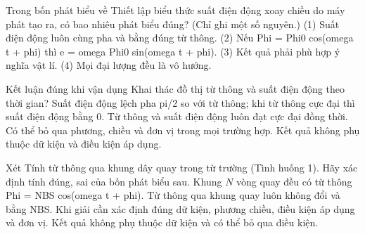 \begin{ex}
Trong bốn phát biểu về Thiết lập biểu thức suất điện động xoay chiều do máy phát tạo ra, có bao nhiêu phát biểu đúng? (Chỉ ghi một số nguyên.) (1) Suất điện động luôn cùng pha và bằng đúng từ thông. (2) Nếu Phi = Phi0 cos(omega t + phi) thì e = omega Phi0 sin(omega t + phi). (3) Kết quả phải phù hợp ý nghĩa vật lí. (4) Mọi đại lượng đều là vô hướng.
\end{ex}

\begin{ex}
Kết luận đúng khi vận dụng Khai thác đồ thị từ thông và suất điện động theo thời gian?
\choice
{\True Suất điện động lệch pha pi/2 so với từ thông; khi từ thông cực đại thì suất điện động bằng 0.}
{Từ thông và suất điện động luôn đạt cực đại đồng thời.}
{Có thể bỏ qua phương, chiều và đơn vị trong mọi trường hợp.}
{Kết quả không phụ thuộc dữ kiện và điều kiện áp dụng.}
\end{ex}

\begin{ex}
Xét Tính từ thông qua khung dây quay trong từ trường (Tình huống 1). Hãy xác định tính đúng, sai của bốn phát biểu sau.
\choiceTF
{\True Khung $N$ vòng quay đều có từ thông Phi = NBS cos(omega t + phi).}
{Từ thông qua khung quay luôn không đổi và bằng NBS.}
{\True Khi giải cần xác định đúng dữ kiện, phương chiều, điều kiện áp dụng và đơn vị.}
{Kết quả không phụ thuộc dữ kiện và có thể bỏ qua điều kiện.}
\end{ex}

